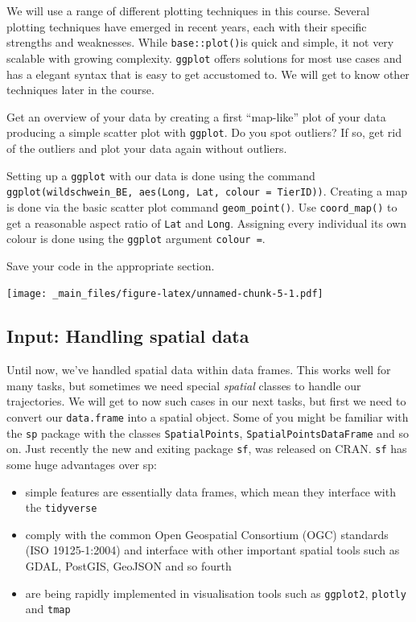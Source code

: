 \documentclass[]{book}
\providecommand{\tightlist}{%
  \setlength{\itemsep}{0pt}\setlength{\parskip}{0pt}}
\theoremstyle{definition}
\theoremstyle{definition}
\theoremstyle{definition}
\theoremstyle{remark}
\begin{document}
We will use a range of different plotting techniques in this course.
Several plotting techniques have emerged in recent years, each with
their specific strengths and weaknesses. While \texttt{base::plot()}is
quick and simple, it not very scalable with growing complexity.
\texttt{ggplot} offers solutions for most use cases and has a elegant
syntax that is easy to get accustomed to. We will get to know other
techniques later in the course.

Get an overview of your data by creating a first ``map-like'' plot of
your data producing a simple scatter plot with \texttt{ggplot}. Do you
spot outliers? If so, get rid of the outliers and plot your data again
without outliers.

Setting up a \texttt{ggplot} with our data is done using the command
\texttt{ggplot(wildschwein\_BE,\ aes(Long,\ Lat,\ colour\ =\ TierID))}.
Creating a map is done via the basic scatter plot command
\texttt{geom\_point()}. Use \texttt{coord\_map()} to get a reasonable
aspect ratio of \texttt{Lat} and \texttt{Long}. Assigning every
individual its own colour is done using the \texttt{ggplot} argument
\texttt{colour\ =}.

Save your code in the appropriate section.

\texttt{[image: \_main\_files/figure-latex/unnamed-chunk-5-1.pdf]}

\subsection{Input: Handling spatial
data}\label{input-handling-spatial-data}

Until now, we've handled spatial data within data frames. This works
well for many tasks, but sometimes we need special \emph{spatial}
classes to handle our trajectories. We will get to now such cases in our
next tasks, but first we need to convert our \texttt{data.frame} into a
spatial object. Some of you might be familiar with the \texttt{sp}
package with the classes \texttt{SpatialPoints},
\texttt{SpatialPointsDataFrame} and so on. Just recently the new and
exiting package \texttt{sf}, was released on CRAN. \texttt{sf} has some
huge advantages over sp:

\begin{itemize}
\tightlist
\item
  simple features are essentially data frames, which mean they interface
  with the \texttt{tidyverse}\\
\item
  comply with the common Open Geospatial Consortium (OGC) standards (ISO
  19125-1:2004) and interface with other important spatial tools such as
  GDAL, PostGIS, GeoJSON and so fourth
\item
  are being rapidly implemented in visualisation tools such as
  \texttt{ggplot2}, \texttt{plotly} and \texttt{tmap}
\end{itemize}
\end{document}
